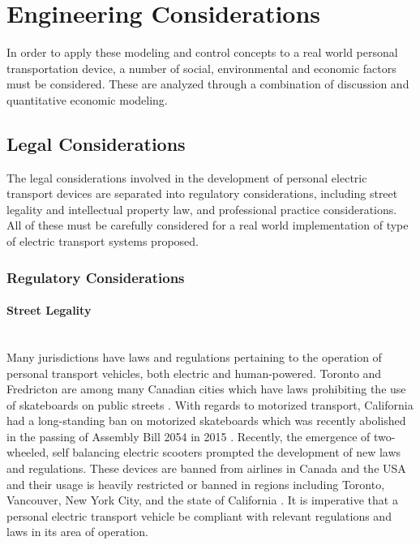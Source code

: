 \section{Engineering Considerations}
In order to apply these modeling and control concepts to a real world personal transportation device, a number of social, environmental and economic factors must be considered. These are analyzed through a combination of discussion and quantitative economic modeling.
\subsection{Legal Considerations}
The legal considerations involved in the development of personal electric transport devices are separated into regulatory considerations, including street legality and intellectual property law, and professional practice considerations. All of these must be carefully considered for a real world implementation of type of electric transport systems proposed. 
\subsubsection{Regulatory Considerations}

\paragraph{Street Legality}\mbox{}\\
Many jurisdictions have laws and regulations pertaining to the operation of personal transport vehicles, both electric and human-powered. 
Toronto and Fredricton are among many Canadian cities which have laws prohibiting the use of skateboards on public streets \cite{TOLaws}. 
With regards to motorized transport, California had a long-standing ban on motorized skateboards which was recently abolished in the passing of Assembly Bill 2054 in 2015 \cite{OCLaws} \cite{WSJLaws}.
Recently, the emergence of two-wheeled, self balancing electric scooters prompted the development of new laws and regulations. 
These devices are banned from airlines in Canada and the USA and their usage is heavily restricted or banned in regions including Toronto, Vancouver, New York City, and the state of California \cite{leetboard}.
It is imperative that a personal electric transport vehicle be compliant with relevant regulations and laws in its area of operation.


